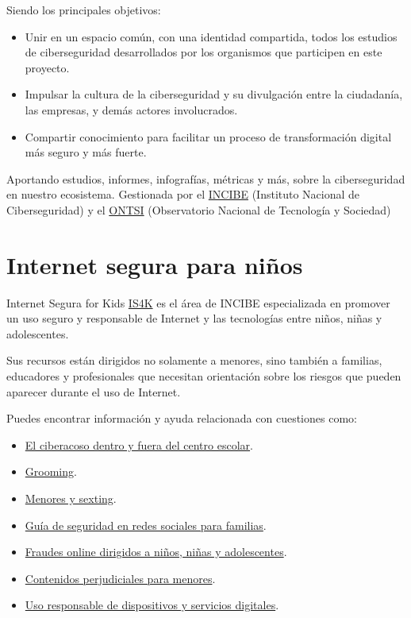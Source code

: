 \documentclass[
  spanish,
  a4paper,
  openany]{book}
\begin{document}
Siendo los principales objetivos:

\begin{itemize}
\item
  Unir en un espacio común, con una identidad compartida, todos los estudios de ciberseguridad desarrollados por los organismos que participen en este proyecto.
\item
  Impulsar la cultura de la ciberseguridad y su divulgación entre la ciudadanía, las empresas, y demás actores involucrados.
\item
  Compartir conocimiento para facilitar un proceso de transformación digital más seguro y más fuerte.
\end{itemize}

Aportando estudios, informes, infografías, métricas y más, sobre la ciberseguridad en nuestro ecosistema. Gestionada por el \href{https://www.incibe.es/}{INCIBE} (Instituto Nacional de Ciberseguridad) y el \href{https://www.ontsi.es/es}{ONTSI} (Observatorio Nacional de Tecnología y Sociedad)

\section{Internet segura para niños}\label{internet-segura-para-niuxf1os}

Internet Segura for Kids \href{https://www.incibe.es/menores/}{IS4K} es el área de INCIBE especializada en promover un uso seguro y responsable de Internet y las tecnologías entre niños, niñas y adolescentes.

Sus recursos están dirigidos no solamente a menores, sino también a familias, educadores y profesionales que necesitan orientación sobre los riesgos que pueden aparecer durante el uso de Internet.

Puedes encontrar información y ayuda relacionada con cuestiones como:

\begin{itemize}
\item
  \href{https://www.incibe.es/menores/blog/el-ciberacoso-dentro-y-fuera-del-centro-escolar}{El ciberacoso dentro y fuera del centro escolar}.
\item
  \href{https://www.incibe.es/menores/tematicas/grooming}{Grooming}.
\item
  \href{https://www.incibe.es/menores/recursos/menores-y-sexting}{Menores y sexting}.
\item
  \href{https://www.incibe.es/menores/materiales/guia-de-seguridad-en-redes-sociales-para-familias}{Guía de seguridad en redes sociales para familias}.
\item
  \href{https://www.incibe.es/menores/tematicas/fraudes-online}{Fraudes online dirigidos a niños, niñas y adolescentes}.
\item
  \href{https://www.incibe.es/node/499772}{Contenidos perjudiciales para menores}.
\item
  \href{https://www.incibe.es/menores/blog/buenas-practicas-para-un-uso-seguro-de-los-dispositivos-del-hogar}{Uso responsable de dispositivos y servicios digitales}.
\end{itemize}
\end{document}
